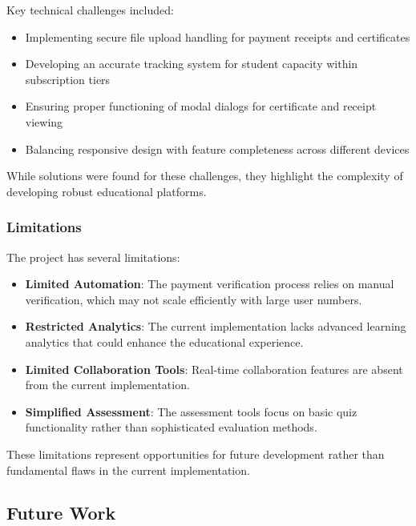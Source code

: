 Key technical challenges included:

\begin{itemize}
    \item Implementing secure file upload handling for payment receipts and certificates
    \item Developing an accurate tracking system for student capacity within subscription tiers
    \item Ensuring proper functioning of modal dialogs for certificate and receipt viewing
    \item Balancing responsive design with feature completeness across different devices
\end{itemize}

While solutions were found for these challenges, they highlight the complexity of developing robust educational platforms.

\subsubsection{Limitations}

The project has several limitations:

\begin{itemize}
    \item \textbf{Limited Automation}: The payment verification process relies on manual verification, which may not scale efficiently with large user numbers.
    
    \item \textbf{Restricted Analytics}: The current implementation lacks advanced learning analytics that could enhance the educational experience.
    
    \item \textbf{Limited Collaboration Tools}: Real-time collaboration features are absent from the current implementation.
    
    \item \textbf{Simplified Assessment}: The assessment tools focus on basic quiz functionality rather than sophisticated evaluation methods.
\end{itemize}

These limitations represent opportunities for future development rather than fundamental flaws in the current implementation.

\subsection{Future Work}

